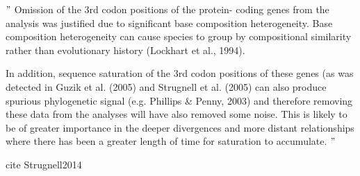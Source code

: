 

\begin{verbatin}
$"$
Omission of the 3rd codon positions of the protein-
coding genes from the analysis was justified due to
significant base composition heterogeneity. Base
composition heterogeneity can cause species to group
by compositional similarity rather than evolutionary
history (Lockhart et al., 1994).

In addition, sequence saturation of the 3rd codon
positions of these genes (as was detected in Guzik
et al. (2005) and Strugnell et al. (2005) can also
produce spurious phylogenetic signal (e.g. Phillips &
Penny, 2003) and therefore removing these data from
the analyses will have also removed some noise. This
is likely to be of greater importance in the deeper
divergences and more distant relationships where
there has been a greater length of time for saturation to
accumulate.
$"$ 
\end{verbatin}
cite {Strugnell2014}





